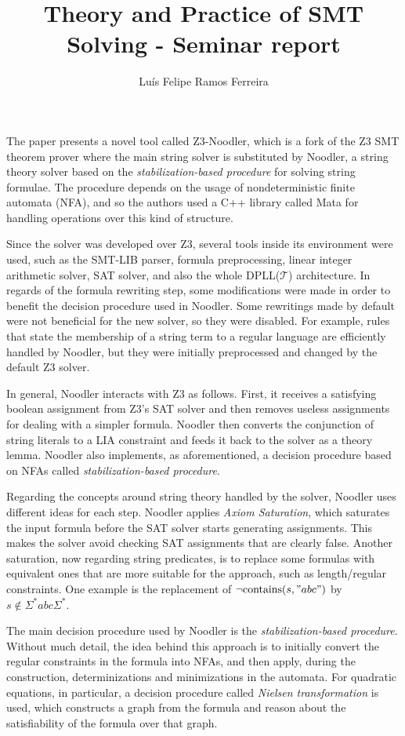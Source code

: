 \documentclass{article}
\title{Theory and Practice of SMT Solving - Seminar report}
\author{Luís Felipe Ramos Ferreira}
\date{}
\begin{document}
\maketitle

The paper presents a novel tool called Z3-Noodler, which is a fork of the Z3 SMT theorem prover where the main string solver is substituted by
Noodler, a string theory solver based on the \textit{stabilization-based procedure} for solving string formulae. The procedure depends on the usage
of nondeterministic finite automata (NFA), and so the authors used a C++ library called Mata for handling operations over this kind of structure.

Since the solver was developed over Z3, several tools inside its environment were used, such as the SMT-LIB parser, formula preprocessing, linear integer arithmetic
solver, SAT solver, and also the whole DPLL(\(\mathcal{T}\)) architecture. In regards of the formula rewriting step, some modifications were
made in order to benefit the decision procedure used in Noodler. Some rewritings made by default were not beneficial for the new solver, so they were disabled.
For example, rules that state the membership of a string term to a regular language are efficiently handled by Noodler, but they were initially preprocessed and changed
by the default Z3 solver.

In general, Noodler interacts with Z3 as follows. First, it receives a satisfying boolean assignment from Z3's SAT solver and then removes
useless assignments for dealing with a simpler formula. Noodler then converts the conjunction of string literals to a LIA constraint and feeds it back
to the solver as a theory lemma. Noodler also implements, as aforementioned, a decision procedure based on NFAs called \textit{stabilization-based procedure}.

Regarding the concepts around string theory handled by the solver, Noodler uses different ideas for each step. Noodler applies \textit{Axiom Saturation},
which saturates the input formula before the SAT solver starts generating assignments. This makes the solver avoid checking SAT assignments that are clearly false. Another
saturation, now regarding string predicates, is to replace some formulas with equivalent ones that are more suitable for the approach, such as length/regular
constraints. One example is the replacement of \(\neg\text{contains}(s, "abc")\) by \(s \notin \Sigma^*abc\Sigma^*\).

The main decision procedure used by Noodler is the \textit{stabilization-based procedure}. Without much detail, the idea behind this approach is to initially convert
the regular constraints in the formula into NFAs, and then apply, during the construction, determinizations and minimizations in the automata. For quadratic equations, in particular, a decision procedure
called \textit{Nielsen transformation} is used, which constructs a graph from the formula and reason about the satisfiability of the formula over that graph.
\end{document}
